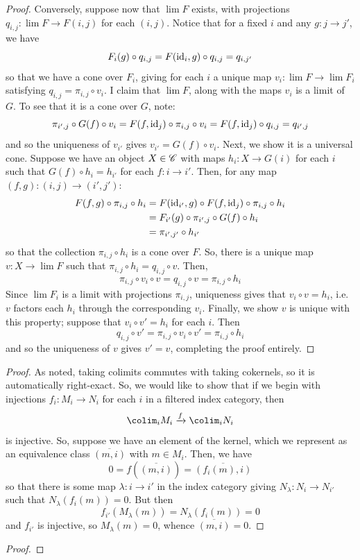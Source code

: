 \documentclass[12pt]{exam}
\begin{document}
\begin{proof}
	Conversely, suppose now that $\lim F$ exists, with projections $q_{i,j} : \lim F \to F(i,j)$ for each $(i,j)$. Notice that for a fixed $i$ and any $g : j \to j'$, we have
	\[ F_i(g) \circ q_{i,j} = F(\operatorname{id}_i,g) \circ q_{i,j} = q_{i,j'} \]
	so that we have a cone over $F_i$, giving for each $i$ a unique map $v_i : \lim F \to \lim F_i$ satisfying $q_{i,j} = \pi_{i,j} \circ v_i$. I claim that $\lim F$, along with the maps $v_i$ is a limit of $G$. To see that it is a cone over $G$, note:
	\[ \pi_{i',j} \circ G(f) \circ v_i = F(f,\operatorname{id}_j) \circ \pi_{i,j} \circ v_i = F(f,\operatorname{id}_j) \circ q_{i,j} = q_{i',j} \]
	and so the uniqueness of $v_{i'}$ gives $v_{i'} = G(f) \circ v_i$. Next, we show it is a universal cone. Suppose we have an object $X \in \mathscr{C}$ with maps $h_i : X \to G(i)$ for each $i$ such that $G(f) \circ h_i = h_{i'}$ for each $f : i \to i'$. Then, for any map $(f,g) : (i,j) \to (i',j')$:
	\begin{align*}
	F(f,g) \circ \pi_{i,j} \circ h_i
		&= F(\operatorname{id}_{i'},g) \circ F(f,\operatorname{id}_j) \circ \pi_{i,j} \circ h_i \\
		&= F_{i'}(g) \circ \pi_{i',j} \circ G(f) \circ h_i \\
		&= \pi_{i',j'} \circ h_{i'}
	\end{align*}
	so that the collection $\pi_{i,j} \circ h_i$ is a cone over $F$. So, there is a unique map $v : X \to \lim F$ such that $\pi_{i,j} \circ h_i = q_{i,j} \circ v$. Then,
	\[ \pi_{i,j} \circ v_i \circ v = q_{i,j} \circ v = \pi_{i,j} \circ h_i \]
	Since $\lim F_i$ is a limit with projections $\pi_{i,j}$, uniqueness gives that $v_i \circ v = h_i$, i.e. $v$ factors each $h_i$ through the corresponding $v_i$. Finally, we show $v$ is unique with this property; suppose that $v_i \circ v' = h_i$ for each $i$. Then
	\[ q_{i,j} \circ v' = \pi_{i,j} \circ v_i \circ v' = \pi_{i,j} \circ h_i \]
	and so the uniqueness of $v$ gives $v' = v$, completing the proof entirely.
\end{proof}

\begin{proof}
	As noted, taking colimits commutes with taking cokernels, so it is automatically right-exact. So, we would like to show that if we begin with injections $f_i : M_i \to N_i$ for each $i$ in a filtered index category, then
	\[ \colim_i M_i \xrightarrow{f} \colim_i N_i \]
	is injective. So, suppose we have an element of the kernel, which we represent as an equivalence class $\overline{(m,i)}$ with $m \in M_i$. Then, we have
	\[ 0 = f\left(\overline{(m,i)}\right) = \overline{(f_i(m),i)} \]
	so that there is some map $\lambda : i \to i'$ in the index category giving $N_\lambda : N_i \to N_{i'}$ such that $N_\lambda(f_i(m)) = 0$. But then
	\[ f_{i'}(M_\lambda(m)) = N_\lambda(f_i(m)) = 0 \]
	and $f_{i'}$ is injective, so $M_\lambda(m) = 0$, whence $\overline{(m,i)} = 0$.
\end{proof}

\begin{proof}
\end{proof}
\end{document}
